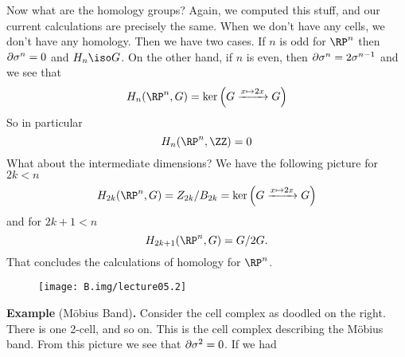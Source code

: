 \begin{ex}
Now what are the homology groups? Again, we computed this stuff,
and our current calculations are precisely the same. When we
don't have any cells, we don't have any homology. Then we have
two cases.
%
If $n$ is odd for $\RP^n$ then $\partial\sigma^n=0$ and $H_n\iso G$.
%
On the other hand, if $n$ is even, then
$\partial\sigma^n=2\sigma^{n-1}$ and we see that
\begin{equation}
H_{n}(\RP^{n},G)=\ker\left(G\xrightarrow{x\mapsto2x}G\right)
\end{equation}
So in particular
\begin{equation}
H_{n}(\RP^n,\ZZ)=0
\end{equation}
What about the intermediate dimensions? We have the following
picture for $2k<n$
\begin{equation}
H_{2k}(\RP^n,G)=Z_{2k}/B_{2k}=\ker\left(G\xrightarrow{x\mapsto2x}G\right)
\end{equation}
and for $2k+1<n$
\begin{equation}
H_{2k+1}(\RP^n,G)=G/2G.
\end{equation}
That concludes the calculations of homology for $\RP^n$.
\end{ex}


\begin{wrapfigure}{r}{5pc}
  \vspace{-12pt}
  \centering
  \texttt{[image: B.img/lecture05.2]}
\end{wrapfigure}
\medbreak
{}
\noindent\textbf{Example \thethm\enspace}(M\"obius Band)\textbf{.}\quad\ignorespaces %
Consider the cell complex as doodled on the right. There is one
2-cell, and so on. This is the cell complex describing the
M\"obius band. From this picture we see that
$\partial\sigma^2=0$. If we had


